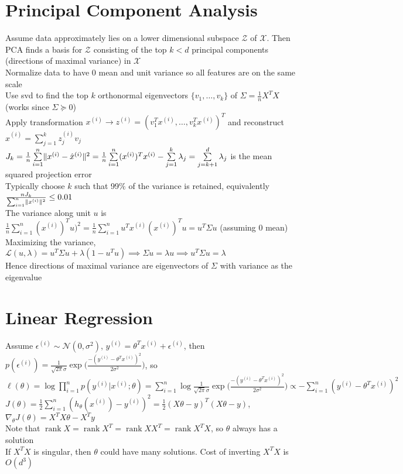 \documentclass{article}
\newcommand{\N}{\mathcal{N}}
\DeclareMathOperator{\rank}{rank}
\DeclarePairedDelimiter\norm{\lVert}{\rVert}
\begin{document}
\section{Principal Component Analysis}
Assume data approximately lies on a lower dimensional subspace $\mathcal{Z}$ of $\mathcal{X}$. Then PCA finds a basis for $\mathcal{Z}$ consisting of the top $k < d$ principal components (directions of maximal variance) in $\mathcal{X}$ \\
Normalize data to have $0$ mean and unit variance so all features are on the same scale \\
Use svd to find the top $k$ orthonormal eigenvectors $\{v_1, \ldots, v_k\}$ of $\Sigma = \frac{1}{n}X^TX$ (works since $\Sigma \succeq 0$) \\
Apply transformation $x^{(i)} \to z^{(i)} = (v_1^T x^{(i)}, \ldots, v_k^T x^{(i)})^T$ and reconstruct $\hat{x}^{(i)} = \sum_{j=1}^k z^{(i)}_j v_j$ \\
$J_k = \frac{1}{n} \sum\limits_{i=1}^n \norm{x^{(i)} - \hat{x}^{(i)}}^2 =  \frac{1}{n}\sum\limits_{i=1}^n (x^{(i)})^Tx^{(i)} - \sum\limits_{j=1}^k \lambda_j = \sum\limits_{j=k+1}^d \lambda_j$ is the mean squared projection error \\
Typically choose $k$ such that 99$\%$ of the variance is retained, equivalently $\frac{nJ_k}{\sum_{i=1}^n\norm{x^{(i)}}^2} \leq 0.01$ \\
The variance along unit $u$ is $\frac{1}{n}\sum_{i=1}^n(x^{(i)})^T u)^2 = \frac{1}{n}\sum_{i=1}^n u^T x^{(i)}(x^{(i)})^Tu = u^T \Sigma u$ (assuming 0 mean) \\
Maximizing the variance, $\mathcal{L}(u, \lambda) = u^T \Sigma u + \lambda(1 - u^Tu) \implies \Sigma u = \lambda u \implies u^T \Sigma u = \lambda$  \\
Hence directions of maximal variance are eigenvectors of $\Sigma$ with variance as the eigenvalue 

\newpage
\section{Linear Regression}
Assume $\epsilon^{(i)} \sim \N(0, \sigma^2)$, $y^{(i)} = \theta^Tx^{(i)} + \epsilon^{(i)}$, then $p(\epsilon^{(i)}) = \frac{1}{\sqrt{2 \pi} \sigma} \exp \big ({\frac{-(y^{(i)} - \theta^T x^{(i)})^2}{2\sigma^2}} \big)$, so \\
$\ell(\theta) = \log \prod\limits_{i=1}^n p(y^{(i)} | x^{(i)} ; \theta) = \sum\limits_{i=1}^n \log \frac{1}{\sqrt{2 \pi} \sigma} \exp \big ({\frac{-(y^{(i)} - \theta^T x^{(i)})^2}{2\sigma^2}} \big) \propto - \sum\limits_{i=1}^n (y^{(i)} - \theta^T x^{(i)})^2$ \\
$J(\theta) = \frac{1}{2} \sum\limits_{i=1}^n (h_\theta(x^{(i)}) - y^{(i)})^2 = \frac{1}{2} (X\theta - y)^T(X\theta - y)$, $\nabla_\theta J(\theta) = X^TX\theta - X^Ty$ \\
Note that $\rank X = \rank X^T = \rank XX^T = \rank X^TX $, so $\theta$ always has a solution \\
If $X^TX$ is singular, then $\theta$ could have many solutions. Cost of inverting $X^TX$ is $O(d^3)$ 
\end{document}
